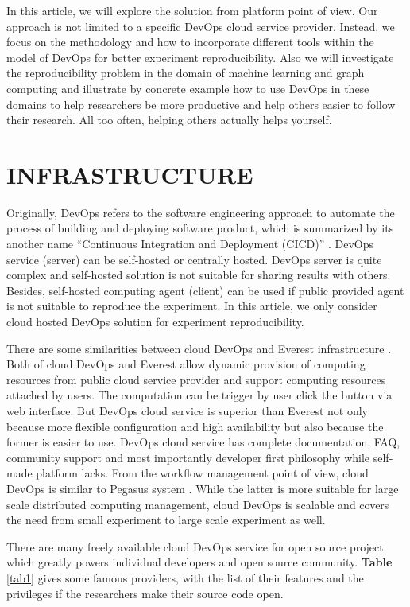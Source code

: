 \documentclass{IEEEcsmag}
\begin{document}
In this article, we will explore the solution from platform point of view. Our approach is not limited to a specific DevOps cloud service provider. Instead, we focus on the methodology and how to incorporate different tools within the model of DevOps for better experiment reproducibility. 
Also we will investigate the reproducibility problem in the domain of machine learning and graph computing and illustrate by concrete example how to use DevOps in these domains to help researchers be more productive and help others easier to follow their research. All too often, helping others actually helps yourself.

\section{INFRASTRUCTURE}
Originally, DevOps refers to the software engineering approach to automate the process of building and deploying software product, which is summarized by its another name ``Continuous Integration and Deployment (CICD)'' \cite{bass2015devops}. 
DevOps service (server) can be self-hosted or centrally hosted. DevOps server is quite complex and self-hosted solution is not suitable for sharing results with others. Besides, self-hosted computing agent (client) can be used if public provided agent is not suitable to reproduce the experiment. In this article, we only consider cloud hosted DevOps solution for experiment reproducibility.

There are some similarities between cloud DevOps and Everest infrastructure \cite{GavishD12} . Both of cloud DevOps and Everest allow dynamic provision of computing resources from public cloud service provider and support computing resources attached by users. The computation can be trigger by user click the button via web interface. But DevOps cloud service is superior than Everest not only because more flexible configuration and high availability but also because the former is easier to use. DevOps cloud service has complete documentation, FAQ, community support and most importantly developer first philosophy while self-made platform lacks.  From the workflow management point of view, cloud DevOps is similar to Pegasus system \cite{Pegasus}. While the latter is more suitable for large scale distributed computing management, cloud DevOps is scalable and covers the need from small experiment to large scale experiment as well.

There are many freely available cloud DevOps service for open source project which greatly powers individual developers and open source community. {\bf Table} \ref{tab1} gives some famous providers, with the list of their features and the privileges if the researchers make their source code open.
\end{document}
